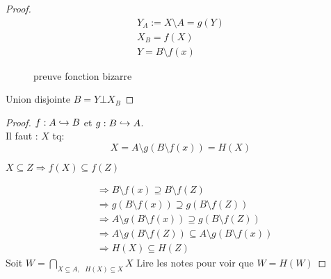 \documentclass[../main.tex]{subfiles}
\begin{document}
\begin{proof}
\begin{align*}
	Y_A := X \setminus A = g(Y)\\
X_B = f(X)\\
Y = B \setminus f(x)
\end{align*}

\begin{figure}[ht]
    \centering
    \caption{preuve fonction bizarre}
    \label{fig:preuve-fonction-bizarre}
\end{figure}
Union disjointe $ B =Y \bot X_B$
\end{proof}
\begin{proof}
$f: A \hookrightarrow B$ et  $g: B \hookrightarrow A$.\\
Il faut : $X$ tq:
\[ 
	X = A \setminus g(B \setminus f(x)) = H(X)
\]

$X  \subseteq Z  \Rightarrow f(X) \subseteq f(Z)$

\begin{align*}
	&\Rightarrow B \setminus f(x) \supseteq B \setminus f(Z)\\
	&\Rightarrow g(B\setminus f(x)) \supseteq g(B \setminus f(Z))\\
	&\Rightarrow A \setminus g(B\setminus f(x)) \supseteq g(B \setminus f(Z))\\
	&\Rightarrow  A \setminus g(B\setminus f(Z)) \subseteq A \setminus g(B\setminus f(x))\\
	&\Rightarrow H(X) \subseteq H(Z)
\end{align*}
Soit $W = \bigcap_{X \subseteq A, \text{  } H(X) \subseteq X}X$ 
Lire les notes pour voir que $W = H(W)$

\end{proof}
\end{document}
